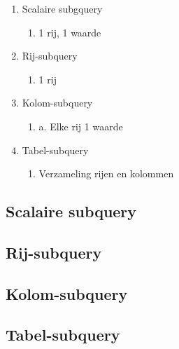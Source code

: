 \begin{enumerate}
    \item Scalaire subgquery
        \begin{enumerate}
   
        \item 1 rij, 1 waarde
        
        \end{enumerate}
        

\item Rij-subquery
\begin{enumerate}
\item 1 rij
\end{enumerate}

\item Kolom-subquery
\begin{enumerate}
\item a.	Elke rij 1 waarde
\end{enumerate}

\item Tabel-subquery
\begin{enumerate}
\item Verzameling rijen en kolommen
\end{enumerate}
\end{enumerate}

\subsection{Scalaire subquery}

\subsection{Rij-subquery}

\subsection{Kolom-subquery}

\subsection{Tabel-subquery}

